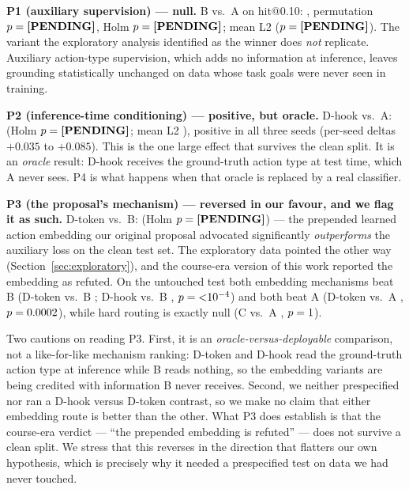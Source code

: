 \textbf{P1 (auxiliary supervision) --- null.} B vs.\ A on hit@0.10:
\ConfBvsA{}, permutation $p=\textbf{[PENDING]}$, Holm $p=\textbf{[PENDING]}$; mean L2
\ConfBvsALtwo{} ($p=\textbf{[PENDING]}$). The variant the exploratory analysis
identified as the winner does \emph{not} replicate. Auxiliary action-type
supervision, which adds no information at inference, leaves grounding
statistically unchanged on data whose task goals were never seen in
training.

\textbf{P2 (inference-time conditioning) --- positive, but oracle.} D-hook
vs.\ A: \ConfDhvsA{} (Holm $p=\textbf{[PENDING]}$; mean L2 \ConfDhvsALtwo{}),
positive in all three seeds (per-seed deltas $+0.035$ to $+0.085$). This is the one large
effect that survives the clean split. It is an \emph{oracle} result:
D-hook receives the ground-truth action type at test time, which A never
sees. P4 is what happens when that oracle is replaced by a real classifier.

\textbf{P3 (the proposal's mechanism) --- reversed in our favour, and we
flag it as such.} D-token vs.\ B: \ConfDtvsB{} (Holm
$p=\textbf{[PENDING]}$) --- the prepended learned action embedding our original
proposal advocated significantly \emph{outperforms} the auxiliary loss on
the clean test set. The exploratory data pointed the other way
(Section~\ref{sec:exploratory}), and the course-era version of this work
reported the embedding as refuted. On the untouched test both embedding
mechanisms beat B (D-token vs.\ B \ConfDtvsB{}; D-hook vs.\ B
\ConfDhvsB{}, $p={<}10^{-4}$) and both beat A (D-token vs.\ A
\ConfDtvsA{}, $p=0.0002$), while hard routing is exactly null
(C vs.\ A \ConfCvsA{}, $p=1$).

Two cautions on reading P3. First, it is an \emph{oracle-versus-deployable}
comparison, not a like-for-like mechanism ranking: D-token and D-hook read
the ground-truth action type at inference while B reads nothing, so the
embedding variants are being credited with information B never receives.
Second, we neither prespecified nor ran a D-hook versus D-token contrast,
so we make no claim that either embedding route is better than the other.
What P3 does establish is that the course-era verdict --- ``the prepended
embedding is refuted'' --- does not survive a clean split. We stress that
this reverses in the direction that flatters our own hypothesis, which is
precisely why it needed a prespecified test on data we had never touched.

